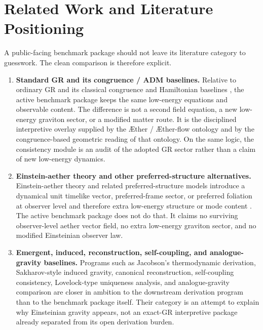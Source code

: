 \documentclass[11pt]{article}
\newcommand{\Aether}{\AE{}ther}
\newcommand{\Aflow}{\AE{}ther-flow}
\begin{document}
\section{Related Work and Literature Positioning}

A public-facing benchmark package should not leave its literature category to guesswork. The clean comparison is therefore explicit.
\begin{enumerate}
    \item \textbf{Standard GR and its congruence / ADM baselines.} Relative to ordinary GR and its classical congruence and Hamiltonian baselines \cite{Einstein1916,Raychaudhuri1955,EllisVanElst1999,ADM1962}, the active benchmark package keeps the same low-energy equations and observable content. The difference is not a second field equation, a new low-energy graviton sector, or a modified matter route. It is the disciplined interpretive overlay supplied by the \Aether{} / \Aflow{} ontology and by the congruence-based geometric reading of that ontology. On the same logic, the consistency module is an audit of the adopted GR sector rather than a claim of new low-energy dynamics.
    \item \textbf{Einstein-aether theory and other preferred-structure alternatives.} Einstein-aether theory and related preferred-structure models introduce a dynamical unit timelike vector, preferred-frame sector, or preferred foliation at observer level and therefore extra low-energy structure or mode content \cite{JacobsonMattingly2001,JacobsonMattingly2004,ElingJacobson2004,Jacobson2010,Jacobson2014,JacobsonSperanza2015,Horava2009}. The active benchmark package does not do that. It claims no surviving observer-level aether vector field, no extra low-energy graviton sector, and no modified Einsteinian observer law.
    \item \textbf{Emergent, induced, reconstruction, self-coupling, and analogue-gravity baselines.} Programs such as Jacobson's thermodynamic derivation, Sakharov-style induced gravity, canonical reconstruction, self-coupling consistency, Lovelock-type uniqueness analysis, and analogue-gravity comparison \cite{Jacobson1995,Visser2002,HojmanKucharTeitelboim1976,Deser2004,Lovelock1971,BarceloLiberatiVisser2011,Sakharov1967} are closer in ambition to the downstream derivation program than to the benchmark package itself. Their category is an attempt to explain why Einsteinian gravity appears, not an exact-GR interpretive package already separated from its open derivation burden.
\end{enumerate}
\end{document}
